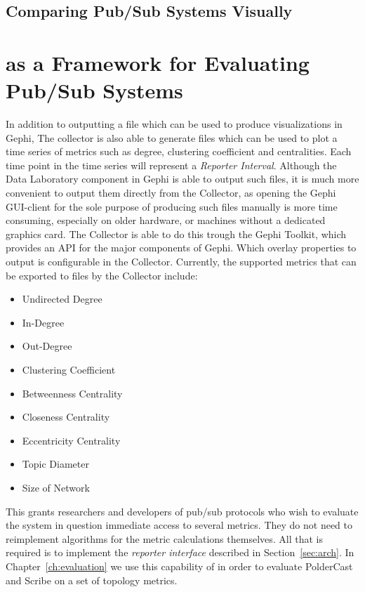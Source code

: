 \subsection{Comparing Pub/Sub Systems Visually}

\section{\demo as a Framework for Evaluating Pub/Sub Systems}

In addition to outputting a \gexf file which can be used to produce
visualizations in Gephi, The collector is also able to generate \csv
files which can be used to plot a time series of metrics such as degree,
clustering coefficient and centralities. Each time point in the time
series will represent a \emph{Reporter Interval}. Although the Data
Laboratory component in Gephi is able to output such \csv files, it is
much more convenient to output them directly from the Collector, as
opening the Gephi GUI-client for the sole purpose of producing such
files manually is more time consuming, especially on older hardware, or
machines without a dedicated graphics card. The Collector is able to do
this trough the Gephi Toolkit, which provides an API for the major
components of Gephi. Which overlay properties to
output is configurable in the Collector.  Currently, the supported
metrics that can be exported to \csv files by the Collector include:

\begin{itemize}
    \item Undirected Degree
    \item In-Degree
    \item Out-Degree
    \item Clustering Coefficient
    \item Betweenness Centrality
    \item Closeness Centrality
    \item Eccentricity Centrality
    \item Topic Diameter
    \item Size of Network
\end{itemize}

This grants researchers and developers of pub/sub protocols who wish to evaluate
the system in question immediate access to several metrics. They do not need to
reimplement algorithms for the metric calculations themselves. All that is
required is to implement the \emph{reporter interface} described in
Section~\ref{sec:arch}. In Chapter~\ref{ch:evaluation} we use this capability of \demo in
order to evaluate PolderCast and Scribe on a set of topology metrics.


